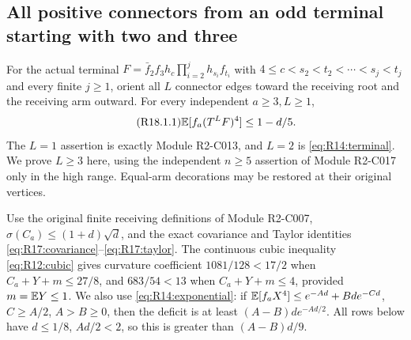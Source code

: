 \subsection{All positive connectors from an odd terminal starting with two and three}\label{proof:R2-C018}
For the actual terminal
$F=\bar f_2f_3h_c\prod_{i=2}^jh_{s_i}f_{t_i}$ with
$4\le c<s_2<t_2<\cdots<s_j<t_j$ and every finite $j\ge1$,
orient all $L$ connector edges toward the receiving root and the
receiving arm outward. For every independent $a\ge3,L\ge1$,
\begin{equation}\tag{R18.1.1}\label{eq:R18:claim}
\mathbb E[f_a(T^LF)^4]\le1-d/5.
\end{equation}
The $L=1$ assertion is exactly Module R2-C013, and
$L=2$ is \eqref{eq:R14:terminal}. We prove $L\ge3$ here, using the
independent $n\ge5$ assertion of Module R2-C017 only in the high range.
Equal-arm decorations may be restored at their original vertices.

Use the original finite receiving definitions of Module R2-C007,
$\sigma(C_a)\le(1+d)\sqrt d$, and the exact covariance and Taylor
identities \eqref{eq:R17:covariance}--\eqref{eq:R17:taylor}.
The continuous cubic inequality \eqref{eq:R12:cubic} gives curvature
coefficient $1081/128<17/2$ when $C_a+Y+m\le27/8$, and
$683/54<13$ when $C_a+Y+m\le4$, provided $m=\mathbb E Y\le1$.
We also use \eqref{eq:R14:exponential}: if
$\mathbb E[f_aX^4]\le e^{-Ad}+Bde^{-Cd}$, $C\ge A/2$, $A>B\ge0$,
then the deficit is at least $(A-B)de^{-Ad/2}$.
All rows below have $d\le1/8$, $Ad/2<2$, so this is greater than
$(A-B)d/9$.

